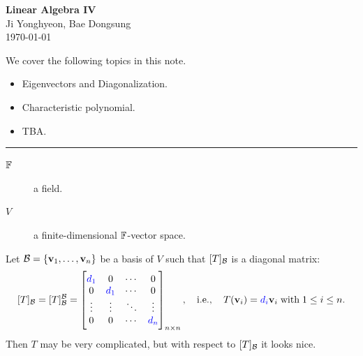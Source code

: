 \documentclass[11pt,openany]{article}
\begin{document}
\begin{center}
	\huge\textbf{Linear Algebra IV}\\
	\vspace{0.5em}
	\large{Ji Yonghyeon,\; Bae Dongsung}\\
	\vspace{0.5em}
	\normalsize{\today}\\
\end{center}

\noindent 
We cover the following topics in this note.
\begin{itemize}
	\item Eigenvectors and Diagonalization.
	\item Characteristic polynomial.
	\item TBA.
\end{itemize}
\hrule\vspace{12pt}
\vfill
\begin{notation}
\;
\begin{description}
	\item[$\mathbb{F}$] a field.
	\item[$V$] a finite-dimensional \(\mathbb{F}\)-vector space.
\end{description}
\end{notation}
\vfill


\newpage
\begin{observation}
Let $\mathcal{B}=\set{\textbf{v}_1,\dots,\textbf{v}_n}$ be a basis of $V$ such that $[T]_{\mathcal{B}}$ is a diagonal matrix: 
\[
[T]_{\mathcal{B}}=[T]_{\mathcal{B}}^{\mathcal{B}}=\begin{bmatrix}
	{\color{blue}d_1} & 0 & \cdots & 0\\
	0 & {\color{blue}d_1} & \cdots & 0 \\
	\vdots & \vdots & \ddots & \vdots \\
	0 & 0 & \cdots & {\color{blue}d_n} \\
\end{bmatrix}_{n\times n},\quad\textnormal{i.e.},\quad T(\textbf{v}_i)={\color{blue}d_i}\textbf{v}_i\;\text{with}\; 1\leq i\leq n.
\]
Then $T$ may be very complicated, but with respect to $[T]_{\mathcal{B}}$ it looks nice. 
\end{observation}
\end{document}
